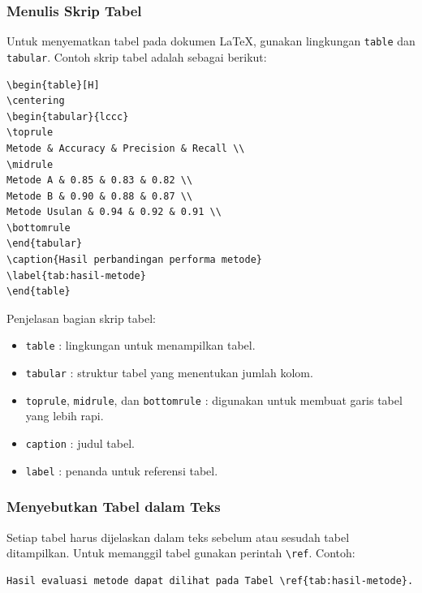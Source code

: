 \subsubsection{Menulis Skrip Tabel}

Untuk menyematkan tabel pada dokumen \LaTeX, gunakan lingkungan
\texttt{table} dan \texttt{tabular}. Contoh skrip tabel adalah sebagai
berikut:

\begin{verbatim}
\begin{table}[H]
\centering
\begin{tabular}{lccc}
\toprule
Metode & Accuracy & Precision & Recall \\
\midrule
Metode A & 0.85 & 0.83 & 0.82 \\
Metode B & 0.90 & 0.88 & 0.87 \\
Metode Usulan & 0.94 & 0.92 & 0.91 \\
\bottomrule
\end{tabular}
\caption{Hasil perbandingan performa metode}
\label{tab:hasil-metode}
\end{table}
\end{verbatim}

Penjelasan bagian skrip tabel:

\begin{itemize}
\item \texttt{table} : lingkungan untuk menampilkan tabel.
\item \texttt{tabular} : struktur tabel yang menentukan jumlah kolom.
\item \texttt{toprule}, \texttt{midrule}, dan \texttt{bottomrule} :
digunakan untuk membuat garis tabel yang lebih rapi.
\item \texttt{caption} : judul tabel.
\item \texttt{label} : penanda untuk referensi tabel.
\end{itemize}

\subsubsection{Menyebutkan Tabel dalam Teks}

Setiap tabel harus dijelaskan dalam teks sebelum atau sesudah tabel
ditampilkan. Untuk memanggil tabel gunakan perintah
\texttt{\textbackslash ref}. Contoh:

\begin{verbatim}
Hasil evaluasi metode dapat dilihat pada Tabel \ref{tab:hasil-metode}.
\end{verbatim}

